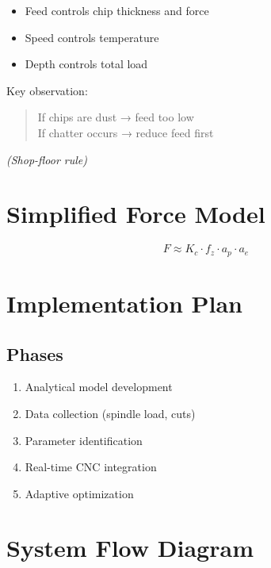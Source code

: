 \documentclass[11pt]{article}
\begin{document}
\begin{itemize}
    \item Feed controls chip thickness and force
    \item Speed controls temperature
    \item Depth controls total load
\end{itemize}

Key observation:
\begin{quote}
If chips are dust → feed too low \\
If chatter occurs → reduce feed first
\end{quote}
\textit{(Shop-floor rule)} 

\section{Simplified Force Model}
\begin{equation}
F \approx K_c \cdot f_z \cdot a_p \cdot a_e
\end{equation}

\section{Implementation Plan}

\subsection{Phases}
\begin{enumerate}
    \item Analytical model development
    \item Data collection (spindle load, cuts)
    \item Parameter identification
    \item Real-time CNC integration
    \item Adaptive optimization
\end{enumerate}

\section{System Flow Diagram}
\end{document}
